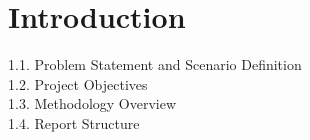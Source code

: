 \setcounter{secnumdepth}{-1}

\chapter{Introduction}
1.1. Problem Statement and Scenario Definition\\
1.2. Project Objectives\\
1.3. Methodology Overview\\
1.4. Report Structure\\
